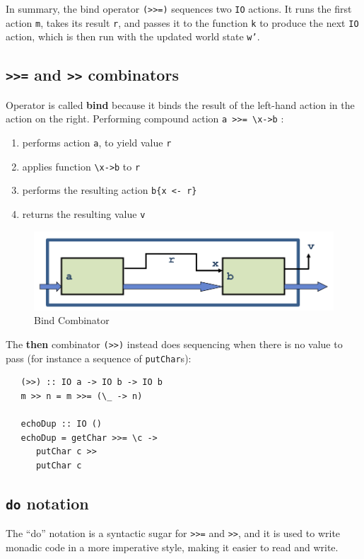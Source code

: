 In summary, the bind operator \texttt{(>>=)} sequences two \texttt{IO} actions. It runs the first action \texttt{m}, takes its result \texttt{r}, and passes it to the function \texttt{k} to produce the next \texttt{IO} action, which is then run with the updated world state \texttt{w’}.



\subsection{\texttt{>>=} and \texttt{>>} combinators}
Operator is called \textbf{bind} because it binds the result
of the left-hand action in the action on the right.
Performing compound action \lstinline|a >>= \x->b| :
\begin{enumerate}
   \item performs action \lstinline|a|, to yield value \lstinline|r|
   \item applies function \lstinline|\x->b| to \lstinline|r|
   \item performs the resulting action \lstinline|b{x <- r}|
   \item returns the resulting value \lstinline|v|
\end{enumerate}

\begin{figure}[htbp]
   \centering
   \includegraphics{images/bind_combinator.png}
   \caption{Bind Combinator}
   \label{fig:bind_combinator}
\end{figure}

The \textbf{then} combinator \lstinline|(>>)| instead does sequencing when there is no value to pass (for instance a sequence of \lstinline|putChar|s):
\begin{lstlisting}
   (>>) :: IO a -> IO b -> IO b
   m >> n = m >>= (\_ -> n)

   echoDup :: IO ()
   echoDup = getChar >>= \c ->
      putChar c >>
      putChar c
\end{lstlisting}

\subsection{\texttt{do} notation}
The ``do'' notation is a syntactic sugar for \lstinline|>>=| and \lstinline|>>|, and it is used to write monadic code in a more imperative style, making it easier to read and write.

